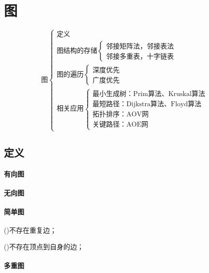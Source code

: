 

\chapter{图}

\[\text{图}\begin{cases}
\text{定义} \\ 
\text{图结构的存储}\begin{cases}
\text{邻接矩阵法，邻接表法} \\ 
\text{邻接多重表，十字链表}\end{cases} \\ 
\text{图的遍历}\begin{cases}
\text{深度优先} \\ 
\text{广度优先}\end{cases} \\ 
\text{相关应用}\begin{cases}
\text{最小生成树：Prim算法、Kruskal算法} \\ 
\text{最短路径：Dijkstra算法、Floyd算法} \\ 
\text{拓扑排序：AOV网} \\ 
\text{关键路径：AOE网}\end{cases}
\end{cases}\]

\section{定义}

\subsubsection{有向图}

\subsubsection{无向图}

\subsubsection{简单图}

()不存在重复边；

()不存在顶点到自身的边；



\subsubsection{多重图}

